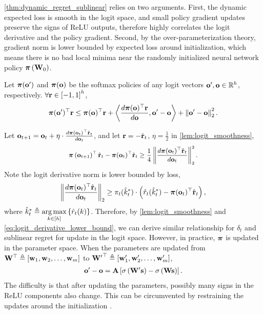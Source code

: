 \cref{thm:dynamic_regret_sublinear} relies on two arguments. First, the dynamic expected loss is smooth in the logit space, and small policy gradient updates preserve the signs of ReLU outputs, therefore highly correlates the logit derivative and the policy gradient. Second, by the over-parameterization theory, gradient norm is lower bounded by expected loss around initialization, which means there is no bad local minima near the randomly initialized neural network policy ${\boldsymbol{\pi}}\left( {\mathbf{W}}_0 \right)$.

\begin{lem}
\label{lem:logit_smoothness}
Let ${\boldsymbol{\pi}}({\mathbf{o}}^\prime)$ and ${\boldsymbol{\pi}}( {\mathbf{o}})$ be the softmax policies of any logit vectors ${\mathbf{o}}^\prime, {\mathbf{o}} \in {\mathbb{R}}^h$, respectively. $\forall {\mathbf{r}} \in \left[ -1, 1\right]^h$,
\begin{equation*}
    {\boldsymbol{\pi}}({\mathbf{o}}^\prime)^\top {\mathbf{r}} \le {\boldsymbol{\pi}}({\mathbf{o}})^\top {\mathbf{r}} + \left\langle \frac{d {\boldsymbol{\pi}}({\mathbf{o}})^\top {\mathbf{r}}}{d {\mathbf{o}}}, {\mathbf{o}}^\prime - {\mathbf{o}} \right\rangle + \left\| {\mathbf{o}}^\prime - {\mathbf{o}} \right\|_2^2.
\end{equation*}
\end{lem}
Let ${\mathbf{o}}_{t+1} = {\mathbf{o}}_{t} + \eta \cdot \frac{d {\boldsymbol{\pi}}({\mathbf{o}}_{t})^\top \hat{{\mathbf{r}}}_t}{d {\mathbf{o}}_{t}}$, and let ${\mathbf{r}} = - \hat{{\mathbf{r}}}_t$, $\eta = \frac{1}{2}$ in \cref{lem:logit_smoothness},
\begin{equation*}
\begin{split}
\small
    \rvpi\left( \rvo_{t+1} \right)^\top \hat{\rvr}_t - \rvpi(\rvo_{t})^\top \hat{\rvr}_t \ge\frac{1}{4} \left\| \frac{d \rvpi(\rvo_{t})^\top \hat{\rvr}_t}{d \rvo_{t}} \right\|_2^2.
\end{split}
\end{equation*}
Note the logit derivative norm is lower bounded by loss,
\begin{equation}
\label{eq:logit_derivative_lower_bound}
\begin{split}
    \left\| \frac{d {\boldsymbol{\pi}}({\mathbf{o}}_{t})^\top \hat{{\mathbf{r}}}_t}{d {\mathbf{o}}_{t}} \right\|_2 \ge \pi_{t}(\hat{k}_t^*) \cdot \left( \hat{r}_{t}(\hat{k}_t^*) - {\boldsymbol{\pi}}({\mathbf{o}}_{t})^\top \hat{{\mathbf{r}}}_t \right),
\end{split}
\end{equation}
where $\hat{k}_t^* \triangleq \operatorname*{arg\,max}\limits_{ k \in [h]}{\left\{ \hat{r}_t(k) \right\}}$. Therefore, by \cref{lem:logit_smoothness} and \cref{eq:logit_derivative_lower_bound}, we can derive similar relationship for $\delta_t$ and sublinear regret for update in the logit space. However, in practice, ${\boldsymbol{\pi}}$ is updated in the parameter space. When the parameters are updated from ${\mathbf{W}}^\top \triangleq \left[ {\mathbf{w}}_1, {\mathbf{w}}_2, \dots, {\mathbf{w}}_m \right]$ to ${{\mathbf{W}}^\prime}^\top \triangleq \left[ {\mathbf{w}}_1^\prime, {\mathbf{w}}_2^\prime, \dots, {\mathbf{w}}_m^\prime \right]$,
\begin{equation*}
\begin{split}
    {\mathbf{o}}^\prime - {\mathbf{o}} = {\mathbf{A}} \left[ \sigma \left( {\mathbf{W}}^\prime {\mathbf{s}} \right) - \sigma \left( {\mathbf{W}} {\mathbf{s}} \right) \right].
\end{split}
\end{equation*}
The difficulty is that after updating the parameters, possibly many signs in the ReLU components also change. This can be circumvented by restraining the updates around the initialization \citep{li2018learning}.

